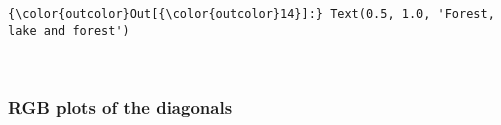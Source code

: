 \documentclass[11pt]{article}
\begin{document}
    \begin{center}
    \end{center}
    { \hspace*{\fill} \\}
    
    \begin{center}
    \end{center}
    { \hspace*{\fill} \\}
    
\begin{Verbatim}[commandchars=\\\{\}]
{\color{outcolor}Out[{\color{outcolor}14}]:} Text(0.5, 1.0, 'Forest, lake and forest')
\end{Verbatim}
            
    \begin{center}
    \end{center}
    { \hspace*{\fill} \\}
    
    \hypertarget{rgb-plots-of-the-diagonals}{%
\subsubsection{RGB plots of the
diagonals}\label{rgb-plots-of-the-diagonals}}
\end{document}
